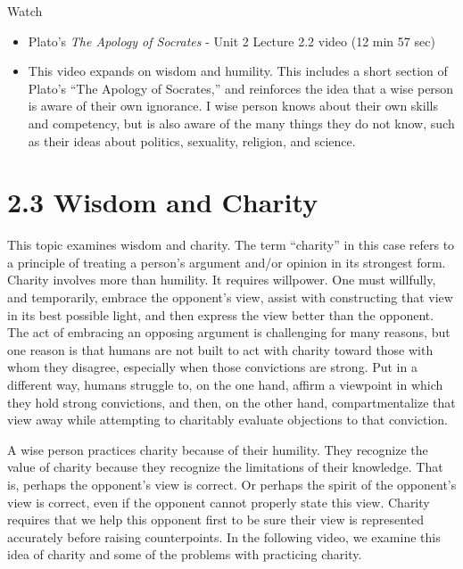 \documentclass[
]{book}
\providecommand{\tightlist}{%
  \setlength{\itemsep}{0pt}\setlength{\parskip}{0pt}}
\begin{document}
Watch

\begin{itemize}
\tightlist
\item
  Plato's \emph{The Apology of Socrates} - Unit 2 Lecture 2.2 video (12 min 57 sec)
\item
  This video expands on wisdom and humility. This includes a short section of Plato's ``The Apology of Socrates,'' and reinforces the idea that a wise person is aware of their own ignorance. I wise person knows about their own skills and competency, but is also aware of the many things they do not know, such as their ideas about politics, sexuality, religion, and science.
\end{itemize}

\hypertarget{wisdom-and-charity}{%
\section*{2.3 Wisdom and Charity}\label{wisdom-and-charity}}

This topic examines wisdom and charity. The term ``charity'' in this case refers to a principle of treating a person's argument and/or opinion in its strongest form. Charity involves more than humility. It requires willpower. One must willfully, and temporarily, embrace the opponent's view, assist with constructing that view in its best possible light, and then express the view better than the opponent. The act of embracing an opposing argument is challenging for many reasons, but one reason is that humans are not built to act with charity toward those with whom they disagree, especially when those convictions are strong. Put in a different way, humans struggle to, on the one hand, affirm a viewpoint in which they hold strong convictions, and then, on the other hand, compartmentalize that view away while attempting to charitably evaluate objections to that conviction.

A wise person practices charity because of their humility. They recognize the value of charity because they recognize the limitations of their knowledge. That is, perhaps the opponent's view is correct. Or perhaps the spirit of the opponent's view is correct, even if the opponent cannot properly state this view. Charity requires that we help this opponent first to be sure their view is represented accurately before raising counterpoints. In the following video, we examine this idea of charity and some of the problems with practicing charity.
\end{document}
